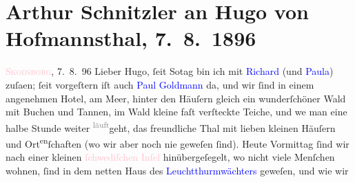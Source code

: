 

               \section[Arthur Schnitzler an Hugo von Hofmannsthal, 7. 8. 1896]{ Arthur Schnitzler an Hugo von Hofmannsthal, 7. 8. 1896}\nopagebreak{}\rehead{ }\normalsize\beginnumbering{} \toendnotes[C]{\smallbreak\pagebreak[2]} 
\toendnotes[C]{\smallbreak}\pstart
           \raggedleft{}{\pb}\textcolor{pink}{\textsc{Skodsborg}}{}\ledrightnote{\textcolor{pink}{Skodsborg}},
                            7. 8. 96\pend
           \pstart
           Lieber Hugo, ſeit So{\geminationn}tag bin ich mit \textcolor{blue}{Richard}{}\ledrightnote{\textcolor{blue}{Richard Beer-Hofmann}} (und
                        \textcolor{blue}{Paula}{}\ledrightnote{\textcolor{blue}{Paula Beer-Hofmann}}) zuſa{\geminationm}en; ſeit vorgeſtern iſt auch \textcolor{blue}{Paul Goldmann}{}\ledrightnote{\textcolor{blue}{Paul Goldmann}}
                    da, und wir ſind in einem angenehmen Hotel, am Meer, hinter den Häuſern gleich
                    ein wunderſchöner Wald mit Buchen und Tannen, im Wald kleine faſt verſteckte
                    Teiche, und we{\geminationn} man eine halbe Stunde weiter \substVorne{}\textsuperscript{\textcolor{gray}{läuft}}\substDazwischen{}geht\substHinten{}, das freundliche Thal mit lieben kleinen Häuſern und Ort\substVorne{}\textsuperscript{en}\substDazwischen{}ſchaften\substHinten{} (wo wir aber noch nie geweſen ſind). Heute Vormittag ſind wir nach
                    einer kleinen \textcolor{pink}{ſchwe{\pb}diſchen Inſel}{} hinübergeſegelt, wo nicht
                    viele Menſchen wohnen, ſind in dem netten Haus des \textcolor{blue}{Leuchtthurmwächters}{} geweſen, und wie wir
